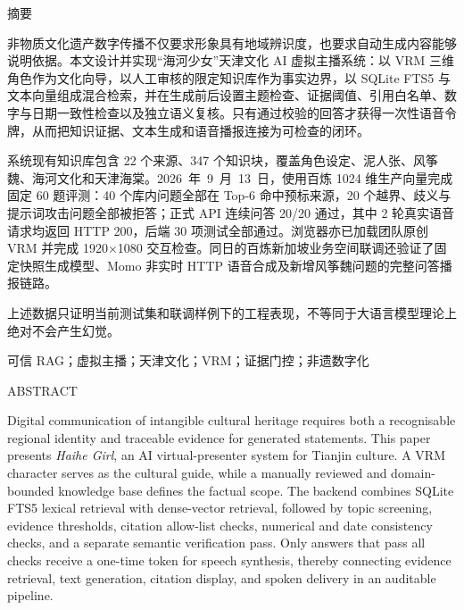 \documentclass[UTF8,zihao=-4,fontset=none,twoside]{ctexart}
\newcommand{\keyword}[1]{\noindent{\heiti 关键词：}#1}
\newcommand{\abstractpara}{\noindent\hspace*{2\ccwd}}
\begin{document}
\clearpage
\hypersetup{pageanchor=true}
\pagestyle{plain}
{}
\begin{center}
  {\heiti{}\fontsize{16pt}{35pt}\selectfont 摘\quad 要\par}
\end{center}
\vspace{2.2em}
\abstractpara 非物质文化遗产数字传播不仅要求形象具有地域辨识度，也要求自动生成内容能够说明依据。本文设计并实现“海河少女”天津文化 AI 虚拟主播系统：以 VRM 三维角色作为文化向导，以人工审核的限定知识库作为事实边界，以 SQLite FTS5 与文本向量组成混合检索，并在生成前后设置主题检查、证据阈值、引用白名单、数字与日期一致性检查以及独立语义复核。只有通过校验的回答才获得一次性语音令牌，从而把知识证据、文本生成和语音播报连接为可检查的闭环。

\abstractpara 系统现有知识库包含 22 个来源、347 个知识块，覆盖角色设定、泥人张、风筝魏、海河文化和天津海棠。\mbox{2026 年 9 月 13 日}，使用百炼 1024 维生产向量完成固定 60 题评测：40 个库内问题全部在 Top-6 命中预标来源，20 个越界、歧义与提示词攻击问题全部被拒答；正式 API 连续问答 20/20 通过，其中 2 轮真实语音请求均返回 HTTP 200，后端 30 项测试全部通过。浏览器亦已加载团队原创 VRM 并完成 1920×1080 交互检查。同日的百炼新加坡业务空间联调还验证了固定快照生成模型、Momo 非实时 HTTP 语音合成及新增风筝魏问题的完整问答播报链路。

\abstractpara 上述数据只证明当前测试集和联调样例下的工程表现，不等同于大语言模型理论上绝对不会产生幻觉。

\vspace{1.5em}
\keyword{可信 RAG；虚拟主播；天津文化；VRM；证据门控；非遗数字化}

\clearpage
{}
{}
\begin{center}
  {\heiti{}\fontsize{16pt}{35pt}\selectfont ABSTRACT\par}
\end{center}
\vspace{2.2em}
\abstractpara Digital communication of intangible cultural heritage requires both a recognisable regional identity and traceable evidence for generated statements. This paper presents \emph{Haihe Girl}, an AI virtual-presenter system for Tianjin culture. A VRM character serves as the cultural guide, while a manually reviewed and domain-bounded knowledge base defines the factual scope. The backend combines SQLite FTS5 lexical retrieval with dense-vector retrieval, followed by topic screening, evidence thresholds, citation allow-list checks, numerical and date consistency checks, and a separate semantic verification pass. Only answers that pass all checks receive a one-time token for speech synthesis, thereby connecting evidence retrieval, text generation, citation display, and spoken delivery in an auditable pipeline.
\end{document}
